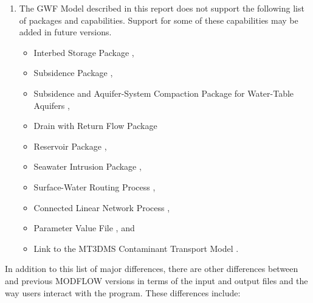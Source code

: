 \begin{enumerate}
\item The GWF Model described in this report does not support the following list of packages and capabilities.  Support for some of these capabilities may be added in future \mf versions.
  \begin{itemize}
    \item Interbed Storage Package \citep{leake1991documentation},
    \item Subsidence Package \citep{hoffmann2003modflow},
    \item Subsidence and Aquifer-System Compaction Package for Water-Table Aquifers \citep{leake2007modflow},
    \item Drain with Return Flow Package \citep{modflowdrtpack}
    \item Reservoir Package \citep{fenske1996documentation},
    \item Seawater Intrusion Package \citep{bakker2013documentation},
    \item Surface-Water Routing Process \citep{hughes2012documentation},
    \item Connected Linear Network Process \citep{modflowusg},
    \item Parameter Value File \citep{modflow2005}, and
    \item Link to the MT3DMS Contaminant Transport Model \citep{zheng2001modflow}.
  \end{itemize}

\end{enumerate}

In addition to this list of major differences, there are other differences between \mf and previous MODFLOW versions in terms of the input and output files and the way users interact with the program.  These differences include:


